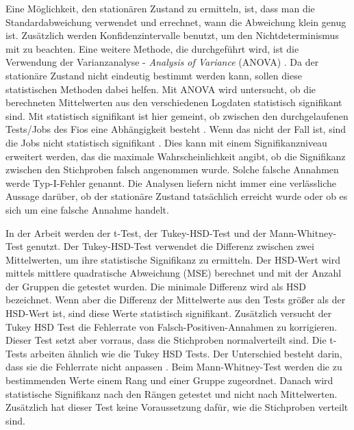 \documentclass{article}
\begin{document}
Eine Möglichkeit, den stationären Zustand zu ermitteln, ist, dass man die Standardabweichung verwendet und errechnet, wann die Abweichung klein genug ist. Zusätzlich werden Konfidenzintervalle benutzt, um den Nichtdeterminismus mit zu beachten. Eine weitere Methode, die durchgeführt wird, ist die Verwendung der Varianzanalyse - \textit{Analysis of Variance} (ANOVA) \cite{stasticsInPerformance}.
Da der stationäre Zustand nicht eindeutig bestimmt werden kann, sollen diese statistischen Methoden dabei helfen.
Mit ANOVA wird untersucht, ob die berechneten Mittelwerten aus den verschiedenen Logdaten statistisch signifikant sind.
Mit statistisch signifikant ist hier gemeint, ob zwischen den durchgelaufenen Tests/Jobs des Fios eine Abhängigkeit besteht \cite{statistischeSigni}. Wenn das nicht der Fall ist, sind die Jobs nicht statistisch signifikant \cite{posthoc}. Dies kann mit einem Signifikanzniveau erweitert werden, das die maximale Wahrscheinlichkeit angibt, ob die Signifikanz zwischen den Stichproben falsch angenommen wurde.
Solche falsche Annahmen werde Typ-I-Fehler genannt. Die Analysen liefern nicht immer eine verlässliche Aussage darüber, ob der stationäre Zustand tatsächlich erreicht wurde oder ob es sich um eine falsche Annahme handelt.

In der Arbeit werden der t-Test, der Tukey-HSD-Test und der Mann-Whitney-Test genutzt.
Der Tukey-HSD-Test verwendet die Differenz zwischen zwei Mittelwerten, um ihre statistische Signifikanz zu ermitteln.
Der HSD-Wert wird mittels mittlere quadratische Abweichung (MSE) berechnet und mit der Anzahl der Gruppen die getestet wurden.
Die minimale Differenz wird als HSD bezeichnet. Wenn aber die Differenz der Mittelwerte aus den Tests größer als der HSD-Wert ist, sind diese Werte statistisch signifikant. Zusätzlich versucht der Tukey HSD Test die Fehlerrate von Falsch-Positiven-Annahmen zu korrigieren. Dieser Test setzt aber vorraus, dass die Stichproben normalverteilt sind. 
Die t-Tests arbeiten ähnlich wie die Tukey HSD Tests. Der Unterschied besteht darin, dass sie die Fehlerrate nicht anpassen \cite{schmidtPaul} \cite{tukeyhsdwiki}. 
Beim Mann-Whitney-Test werden die zu bestimmenden Werte einem Rang und einer Gruppe zugeordnet. Danach wird statistische Signifikanz nach den Rängen getestet und nicht nach Mittelwerten. Zusätzlich hat dieser Test keine Voraussetzung dafür, wie die Stichproben verteilt sind.
\end{document}
